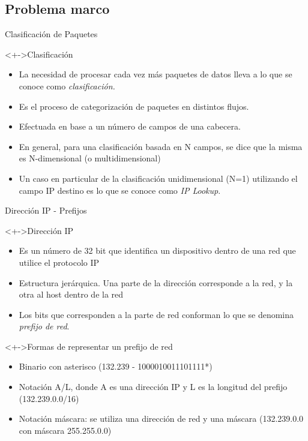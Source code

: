 \documentclass[xcolor=dvipsnames]{beamer}
\begin{document}
\subsection{Problema marco}

\begin{frame}{Clasificación de Paquetes}

 \begin{block}<+->{Clasificación}   
    \begin{itemize}
      \scriptsize
      \item La necesidad de procesar cada vez más paquetes de datos lleva a lo que se conoce como \textit{clasificación.}
      \item Es el proceso de categorización de paquetes en distintos flujos.
      \item Efectuada en base a un número de campos de una cabecera.
      \item En general, para una clasificación basada en N campos, se dice que la misma es N-dimensional (o multidimensional) 
      \item Un caso en particular de la clasificación unidimensional (N=1) utilizando el campo IP destino es lo que se conoce como \textit{IP Lookup}.     
    \end{itemize}
  \end{block}
\end{frame}

\begin{frame}{Dirección IP - Prefijos}
 \begin{block}<+->{Dirección IP}   
    \begin{itemize}
      \scriptsize
      \item Es un número de 32 bit que identifica un dispositivo dentro de una red que utilice el protocolo IP
      \item Estructura jerárquica. Una parte de la dirección corresponde a la red, y la otra al host dentro de la red
      \item Los bits que corresponden a la parte de red conforman lo que se denomina \textit{prefijo de red}.
     \end{itemize}
  \end{block}
\begin{block}<+->{Formas de representar un prefijo de red}   
    \begin{itemize}
      \scriptsize
      \item Binario con asterisco (132.239 - 1000010011101111*)
      \item Notación A/L, donde A es una dirección IP y L es la longitud del prefijo (132.239.0.0/16)
      \item Notación máscara: se utiliza una dirección de red y una máscara (132.239.0.0 con máscara 255.255.0.0)
     \end{itemize}
  \end{block}
\end{frame}
\end{document}

